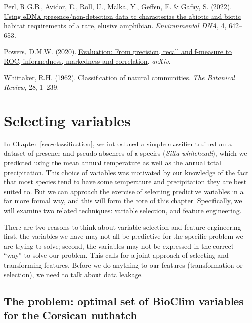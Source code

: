 \documentclass[
  letterpaper,
]{scrbook}
\newlength{\cslhangindent}
\newenvironment{CSLReferences}[2] %
 {\begin{list}{}{%
  \setlength{\itemindent}{0pt}
  \setlength{\leftmargin}{0pt}
  \setlength{\parsep}{0pt}
  \ifodd #1
   \setlength{\leftmargin}{\cslhangindent}
   \setlength{\itemindent}{-1\cslhangindent}
  \fi
  \setlength{\itemsep}{#2\baselineskip}}}
 {\end{list}}
\begin{document}
\begin{CSLReferences}{1}{0}
Perl, R.G.B., Avidor, E., Roll, U., Malka, Y., Geffen, E. \& Gafny, S.
(2022). \href{https://doi.org/10.1002/edn3.276}{Using eDNA
presence/non{-}detection data to characterize the abiotic and biotic
habitat requirements of a rare, elusive amphibian}. \emph{Environmental
DNA}, 4, 642--653.

Powers, D.M.W. (2020).
\href{https://doi.org/10.48550/ARXIV.2010.16061}{Evaluation: From
precision, recall and f-measure to ROC, informedness, markedness and
correlation}. \emph{arXiv}.

Whittaker, R.H. (1962).
\href{https://doi.org/10.1007/bf02860872}{Classification of natural
communities}. \emph{The Botanical Review}, 28, 1--239.

\end{CSLReferences}


\chapter{Selecting variables}\label{sec-predictors}

In Chapter~\ref{sec-classification}, we introduced a simple classifier
trained on a dataset of presence and pseudo-absences of a species
(\emph{Sitta whiteheadi}), which we predicted using the mean annual
temperature as well as the annual total precipitation. This choice of
variables was motivated by our knowledge of the fact that most species
tend to have some temperature and precipitation they are best suited to.
But we can approach the exercise of selecting predictive variables in a
far more formal way, and this will form the core of this chapter.
Specifically, we will examine two related techniques: variable
selection, and feature engineering.

There are two reasons to think about variable selection and feature
engineering -- first, the variables we have may not all be predictive
for the specific problem we are trying to solve; second, the variables
may not be expressed in the correct ``way'' to solve our problem. This
calls for a joint approach of selecting and transforming features.
Before we do anything to our features (transformation or selection), we
need to talk about data leakage.

\section{The problem: optimal set of BioClim variables for the Corsican
nuthatch}\label{the-problem-optimal-set-of-bioclim-variables-for-the-corsican-nuthatch}
\end{document}
